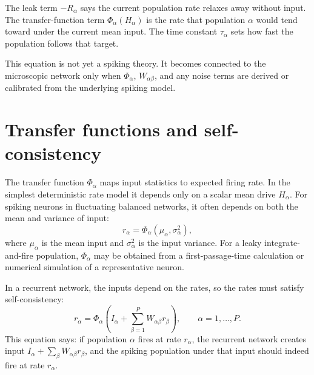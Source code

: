 \noindent The leak term $-R_\alpha$ says the current population rate relaxes away without input. The transfer-function term $\Phi_\alpha(H_\alpha)$ is the rate that population $\alpha$ would tend toward under the current mean input. The time constant $\tau_\alpha$ sets how fast the population follows that target.

This equation is not yet a spiking theory. It becomes connected to the microscopic network only when $\Phi_\alpha$, $W_{\alpha\beta}$, and any noise terms are derived or calibrated from the underlying spiking model.

\section{Transfer functions and self-consistency}
\label{sec:transfer-functions-self-consistency}

The transfer function $\Phi_\alpha$ maps input statistics to expected firing rate. In the simplest deterministic rate model it depends only on a scalar mean drive $H_\alpha$. For spiking neurons in fluctuating balanced networks, it often depends on both the mean and variance of input:
%
\begin{equation}
  r_\alpha
  =
  \Phi_\alpha(\mu_\alpha,\sigma_\alpha^2),
  \label{eq:transfer-mean-variance}
\end{equation}
%
where $\mu_\alpha$ is the mean input and $\sigma_\alpha^2$ is the input variance. For a leaky integrate-and-fire population, $\Phi_\alpha$ may be obtained from a first-passage-time calculation or numerical simulation of a representative neuron.

In a recurrent network, the inputs depend on the rates, so the rates must satisfy self-consistency:
%
\begin{equation}
  r_\alpha
  =
  \Phi_\alpha\!\left(
    I_\alpha
    +
    \sum_{\beta=1}^P W_{\alpha\beta}r_\beta
  \right),
  \qquad
  \alpha=1,\ldots,P.
  \label{eq:mf-self-consistency}
\end{equation}
%
This equation says: if population $\alpha$ fires at rate $r_\alpha$, the recurrent network creates input $I_\alpha+\sum_\beta W_{\alpha\beta}r_\beta$, and the spiking population under that input should indeed fire at rate $r_\alpha$.

